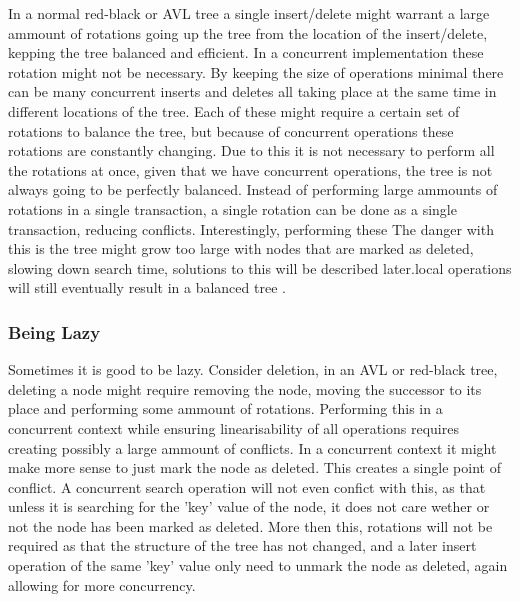 \documentclass[10pt]{sigplanconf}
\begin{document}
In a normal red-black or AVL tree a single insert/delete might warrant a large ammount of rotations going up the tree from the location of the insert/delete,
kepping the tree balanced and efficient.
In a concurrent implementation these rotation might not be necessary.
By keeping the size of operations minimal there can be many concurrent inserts and deletes all taking place at the same time in different locations of the tree.
Each of these might require a certain set of rotations to balance the tree, but because of concurrent operations these rotations are constantly changing.
Due to this it is not necessary to perform all the rotations at once, given that we have concurrent operations, the tree is not always going to be perfectly balanced.
Instead of performing large ammounts of rotations in a single transaction, a single rotation can be done as a single transaction, reducing conflicts.
Interestingly, performing these The danger with this is the tree might grow too large with nodes that are marked as deleted, slowing down search time, solutions to this will be
described later.local operations will still eventually result in a balanced tree \cite{}.

\subsubsection{Being Lazy}
Sometimes it is good to be lazy.
Consider deletion, in an AVL or red-black tree, deleting a node might require removing the node, moving the successor to its place and performing
some ammount of rotations.
Performing this in a concurrent context while ensuring linearisability of all operations requires creating possibly a large ammount of conflicts.
In a concurrent context it might make more sense to just mark the node as deleted.
This creates a single point of conflict.
A concurrent search operation will not even confict with this, as that unless it is searching for the 'key' value of the node, it does not care wether
or not the node has been marked as deleted.
More then this, rotations will not be required as that the structure of the tree has not changed, and a later insert operation of the same 'key'
value only need to unmark the node as deleted, again allowing for more concurrency.
\end{document}
